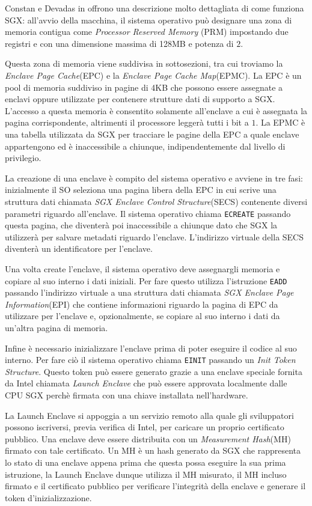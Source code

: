 \documentclass[12pt,italian]{report}
\begin{document}
Constan e Devadas in \cite{sgxexplained} offrono una descrizione molto
dettagliata di come funziona SGX:
all'avvio della macchina, il sistema operativo può designare una zona
di memoria contigua come \textit{Processor Reserved Memory} (PRM) impostando
due registri e con una dimensione massima di 128MB e potenza di $2$.

Questa zona di memoria viene suddivisa in sottosezioni, tra cui troviamo
la \textit{Enclave Page Cache}(EPC) e la
\textit{Enclave Page Cache Map}(EPMC).
La EPC è un pool di memoria suddiviso in pagine di 4KB che possono essere
assegnate a enclavi oppure utilizzate per contenere strutture dati di
supporto a SGX.
L'accesso a questa memoria è consentito solamente all'enclave a cui è
assegnata la pagina corrispondente, altrimenti il processore leggerà tutti
i bit a $1$.
La EPMC è una tabella utilizzata da SGX per tracciare le pagine della EPC
a quale enclave appartengono ed è inaccessibile a chiunque, indipendentemente
dal livello di privilegio.

La creazione di una enclave è compito del sistema operativo e
avviene in tre fasi:
inizialmente il SO seleziona una pagina libera della EPC in cui scrive una
struttura dati chiamata \textit{SGX Enclave Control Structure}(SECS)
contenente diversi parametri riguardo all'enclave. 
Il sistema operativo chiama \texttt{ECREATE} passando questa pagina, che
diventerà poi inaccessibile a chiunque dato che SGX la utilizzerà per
salvare metadati riguardo l'enclave.
L'indirizzo virtuale della SECS diventerà un identificatore per l'enclave.

Una volta create l'enclave, il sistema operativo deve assegnargli memoria
e copiare al suo interno i dati iniziali.
Per fare questo utilizza l'istruzione \texttt{EADD} passando
l'indirizzo virtuale a una struttura dati chiamata
\textit{SGX Enclave Page Information}(EPI) che contiene
informazioni riguardo la pagina di EPC da utilizzare per l'enclave
e, opzionalmente, se copiare al suo interno i dati da un'altra pagina
di memoria.

Infine è necessario inizializzare l'enclave prima di poter eseguire
il codice al suo interno.
Per fare ciò il sistema operativo chiama \texttt{EINIT} passando
un \textit{Init Token Structure}. Questo token può essere generato grazie
a una enclave speciale fornita da Intel chiamata \textit{Launch Enclave}
che può essere approvata localmente dalle CPU SGX perchè firmata con una
chiave installata nell'hardware.

La Launch Enclave si appoggia a un servizio remoto alla quale
gli sviluppatori possono iscriversi, previa verifica di Intel, per caricare
un proprio certificato pubblico.
Una enclave deve essere distribuita con un \textit{Measurement Hash}(MH)
firmato con tale certificato.
Un MH è un hash generato da SGX che rappresenta lo stato di una enclave appena
prima che questa possa eseguire la sua prima istruzione, la Launch Enclave
dunque utilizza il MH misurato, il MH incluso firmato e il
certificato pubblico per verificare l'integrità della enclave e generare il
token d'inizializzazione.
\end{document}
